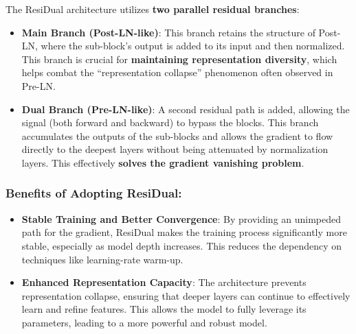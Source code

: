 The ResiDual architecture utilizes \textbf{two parallel residual branches}:

\begin{itemize}[nosep]
    \item \textbf{Main Branch (Post-LN-like)}: This branch retains the structure of Post-LN, where the sub-block's output is added to its input and then normalized. This branch is crucial for \textbf{maintaining representation diversity}, which helps combat the ``representation collapse'' phenomenon often observed in Pre-LN.
    
    \item \textbf{Dual Branch (Pre-LN-like)}: A second residual path is added, allowing the signal (both forward and backward) to bypass the blocks. This branch accumulates the outputs of the sub-blocks and allows the gradient to flow directly to the deepest layers without being attenuated by normalization layers. This effectively \textbf{solves the gradient vanishing problem}.
\end{itemize}

\subsubsection*{Benefits of Adopting ResiDual:}

\begin{itemize}[nosep]
    \item \textbf{Stable Training and Better Convergence}: By providing an unimpeded path for the gradient, ResiDual makes the training process significantly more stable, especially as model depth increases. This reduces the dependency on techniques like learning-rate warm-up.

    \item \textbf{Enhanced Representation Capacity}: The architecture prevents representation collapse, ensuring that deeper layers can continue to effectively learn and refine features. This allows the model to fully leverage its parameters, leading to a more powerful and robust model.
\end{itemize}
